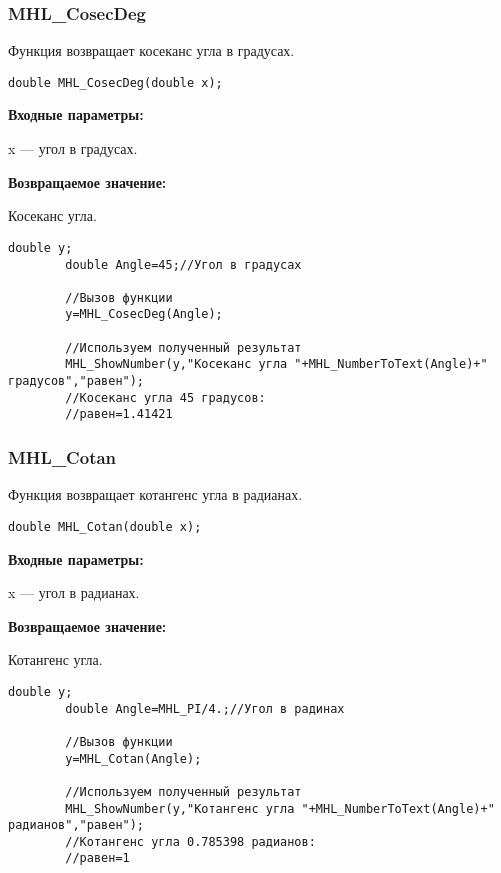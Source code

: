 \documentclass[a4paper,12pt]{article}
\begin{document}
\subsubsection{MHL\_CosecDeg}\label{MHL_CosecDeg}

Функция возвращает косеканс угла в градусах.


\begin{lstlisting}[label=code_syntax_MHL_CosecDeg,caption=Синтаксис]
double MHL_CosecDeg(double x);
\end{lstlisting}

\textbf{Входные параметры:}

 x --- угол в градусах.

\textbf{Возвращаемое значение:}

Косеканс угла.


\begin{lstlisting}[label=code_use_MHL_CosecDeg,caption=Пример использования]
        double y;
        double Angle=45;//Угол в градусах

        //Вызов функции
        y=MHL_CosecDeg(Angle);

        //Используем полученный результат
        MHL_ShowNumber(y,"Косеканс угла "+MHL_NumberToText(Angle)+" градусов","равен");
        //Косеканс угла 45 градусов:
        //равен=1.41421
\end{lstlisting}

\subsubsection{MHL\_Cotan}\label{MHL_Cotan}

Функция возвращает котангенс угла в радианах.


\begin{lstlisting}[label=code_syntax_MHL_Cotan,caption=Синтаксис]
double MHL_Cotan(double x);
\end{lstlisting}

\textbf{Входные параметры:}

 x --- угол в радианах.

\textbf{Возвращаемое значение:}

Котангенс угла.


\begin{lstlisting}[label=code_use_MHL_Cotan,caption=Пример использования]
        double y;
        double Angle=MHL_PI/4.;//Угол в радинах

        //Вызов функции
        y=MHL_Cotan(Angle);

        //Используем полученный результат
        MHL_ShowNumber(y,"Котангенс угла "+MHL_NumberToText(Angle)+" радианов","равен");
        //Котангенс угла 0.785398 радианов:
        //равен=1
\end{lstlisting}
\end{document}
